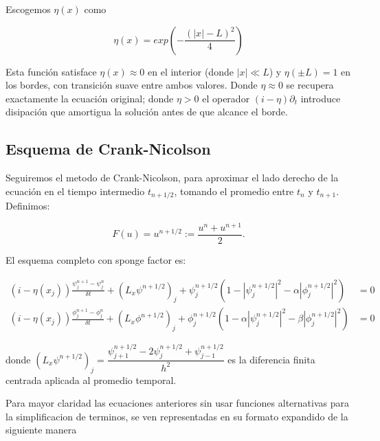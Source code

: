\documentclass[letterpaper,11pt]{exam}
\theoremstyle{plain}
\begin{document}
Escogemos $\eta(x)$ como

\begin{equation}
    \eta(x)=exp \left ( -\frac{(|x|-L)^2}{4}\right)
\end{equation}





Esta función satisface $\eta(x) \approx 0$ en el interior 
(donde $|x| \ll L$) y $\eta(\pm L) = 1$ en los bordes, con 
transición suave entre ambos valores. Donde $\eta \approx 0$ 
se recupera exactamente la ecuación original; donde $\eta > 0$ 
el operador $(i-\eta)\partial_t$ introduce disipación que 
amortigua la solución antes de que alcance el borde.

\subsection{Esquema de Crank-Nicolson}
Seguiremos el metodo de Crank-Nicolson, para aproximar el lado derecho de la ecuación en el tiempo intermedio $t_{n+1/2}$, tomando el 
promedio entre $t_n$ y $t_{n+1}$. Definimos:

\begin{equation*}
   F(u)= u^{n+1/2} := \frac{u^n + u^{n+1}}{2}.
\end{equation*}

El esquema completo con sponge factor es:

\begin{align}
    (i-\eta(x_j))\frac{\psi_j^{n+1}-\psi_j^n}{\delta t} + 
    (L_x\psi^{n+1/2})_j + 
    \psi_j^{n+1/2}(1-|\psi_j^{n+1/2}|^2-
    \alpha|\phi_j^{n+1/2}|^2) &= 0 \\
    (i-\eta(x_j))\frac{\phi_j^{n+1}-\phi_j^n}{\delta t} + 
    (L_x\phi^{n+1/2})_j + 
    \phi_j^{n+1/2}(1-\alpha|\psi_j^{n+1/2}|^2-
    \beta|\phi_j^{n+1/2}|^2) &= 0
\end{align}

donde $(L_x\psi^{n+1/2})_j = \dfrac{\psi_{j+1}^{n+1/2} - 
2\psi_j^{n+1/2} + \psi_{j-1}^{n+1/2}}{h^2}$ es la diferencia 
finita centrada aplicada al promedio temporal.

\hspace{2mm}

Para mayor claridad las ecuaciones anteriores sin usar funciones alternativas para la simplificacion de terminos, se ven representadas en su formato expandido de la siguiente manera
\end{document}
